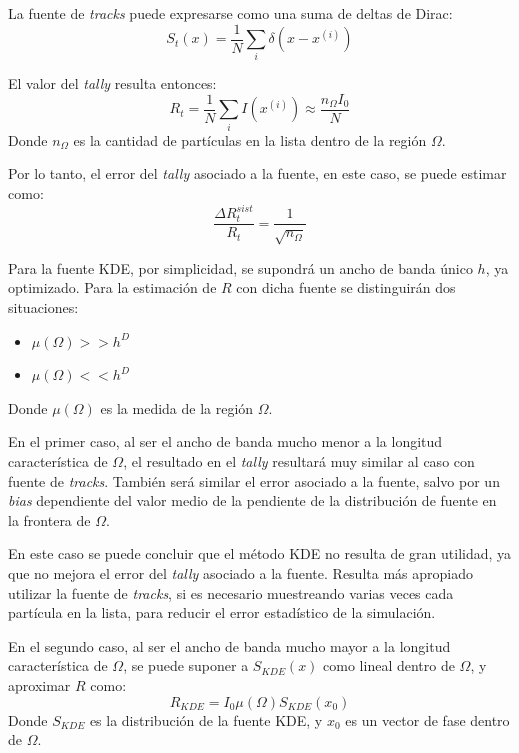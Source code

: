 La fuente de \emph{tracks} puede expresarse como una suma de deltas de Dirac:
\begin{equation}
    S_t(x) = \frac{1}{N} \sum_i \delta\left(x-x^{(i)}\right)
\end{equation}

El valor del \emph{tally} resulta entonces:
\begin{equation}
    \label{eq:Rt}
    R_t = \frac{1}{N} \sum_i I(x^{(i)}) \approx \frac{n_{\Omega} I_0}{N}
\end{equation}
Donde $n_{\Omega}$ es la cantidad de partículas en la lista dentro de la región $\Omega$.

Por lo tanto, el error del \emph{tally} asociado a la fuente, en este caso, se puede estimar como:
\begin{equation}
    \frac{\Delta R_t^{sist}}{R_t} = \frac{1}{\sqrt{n_{\Omega}}}
\end{equation}

Para la fuente KDE, por simplicidad, se supondrá un ancho de banda único $h$, ya optimizado. Para la estimación de $R$ con dicha fuente se distinguirán dos situaciones:
\begin{itemize}
    \item $\mu(\Omega) >> h^D$
    \item $\mu(\Omega) << h^D$
\end{itemize}
Donde $\mu(\Omega)$ es la medida de la región $\Omega$.

En el primer caso, al ser el ancho de banda mucho menor a la longitud característica de $\Omega$, el resultado en el \emph{tally} resultará muy similar al caso con fuente de \emph{tracks}. También será similar el error asociado a la fuente, salvo por un \emph{bias} dependiente del valor medio de la pendiente de la distribución de fuente en la frontera de $\Omega$.

En este caso se puede concluir que el método KDE no resulta de gran utilidad, ya que no mejora el error del \emph{tally} asociado a la fuente. Resulta más apropiado utilizar la fuente de \emph{tracks}, si es necesario muestreando varias veces cada partícula en la lista, para reducir el error estadístico de la simulación.

En el segundo caso, al ser el ancho de banda mucho mayor a la longitud característica de $\Omega$, se puede suponer a $S_{KDE}(x)$ como lineal dentro de $\Omega$, y aproximar $R$ como:
\begin{equation}
    R_{KDE} = I_0 \mu(\Omega) S_{KDE}(x_0)
\end{equation}
Donde $S_{KDE}$ es la distribución de la fuente KDE, y $x_0$ es un vector de fase dentro de $\Omega$.

